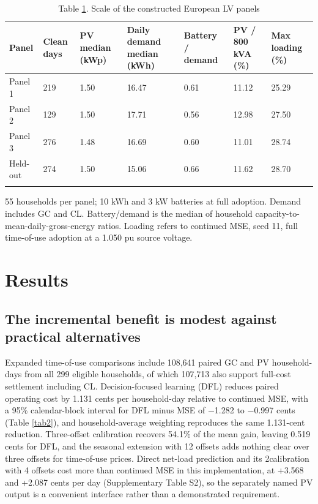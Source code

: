 \documentclass[pdflatex,Numbered,sn-basic]{sn-jnl}
\begin{document}
\begin{table}[htbp]
\centering
\caption{Table \ref{tab1}. Scale of the constructed European LV panels}
\label{tab1}
\small
\setlength{\tabcolsep}{3pt}
\begin{tabular}{@{}p{66pt}p{50pt}p{52pt}p{58pt}p{55pt}p{48pt}p{40pt}@{}}
\toprule
\textbf{Panel} & \textbf{Clean days} & \textbf{PV median (kWp)} & \textbf{Daily demand median (kWh)} & \textbf{Battery / demand} & \textbf{PV / 800 kVA (\%)} & \textbf{Max loading (\%)} \\
\midrule
Panel 1 & 219 & 1.50 & 16.47 & 0.61 & 11.12 & 25.29 \\
Panel 2 & 129 & 1.50 & 17.71 & 0.56 & 12.98 & 27.50 \\
Panel 3 & 276 & 1.48 & 16.69 & 0.60 & 11.01 & 28.74 \\
Held-out & 274 & 1.50 & 15.06 & 0.66 & 11.62 & 28.70 \\
\botrule
\end{tabular}
\par\vspace{2pt}
\footnotesize 55 households per panel; 10 kWh and 3 kW batteries at full adoption. Demand includes GC and CL. Battery/demand is the median of household capacity-to-mean-daily-gross-energy ratios. Loading refers to continued MSE, seed 11, full time-of-use adoption at a 1.050 pu source voltage.
\end{table}

\section{Results}

\subsection{The incremental benefit is modest against practical alternatives}

Expanded time-of-use comparisons include 108,641 paired GC and PV household-days from all 299 eligible households, of which 107,713 also support full-cost settlement including CL. Decision-focused learning (DFL) reduces paired operating cost by 1.131 cents per household-day relative to continued MSE, with a 95\% calendar-block interval for DFL minus MSE of $-$1.282 to $-$0.997 cents (Table \ref{tab2}), and household-average weighting reproduces the same 1.131-cent reduction. Three-offset calibration recovers 54.1\% of the mean gain, leaving 0.519 cents for DFL, and the seasonal extension with 12 offsets adds nothing clear over three offsets for time-of-use prices. Direct net-load prediction and its 2calibration with 4 offsets cost more than continued MSE in this implementation, at +3.568 and +2.087 cents per day (Supplementary Table S2), so the separately named PV output is a convenient interface rather than a demonstrated requirement.
\end{document}

